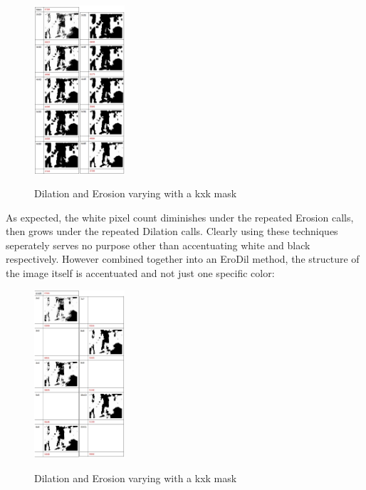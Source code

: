 \documentclass[11pt]{article} %
\begin{document}
\begin{figure}
	\vspace{-20pt}
	\begin{center}
		\includegraphics[width=0.3\textwidth]{../images/ImageOps/test2A}
		\label{img:erode3}
	\end{center}
	\vspace{-20pt}
	\caption{Dilation and Erosion varying with a kxk mask}
\end{figure}
As expected, the white pixel count diminishes under the repeated Erosion calls, then grows under the repeated Dilation calls. Clearly using these techniques seperately serves no purpose other than accentuating white and black respectively. However combined together into an EroDil method, the structure of the image itself is accentuated and not just one specific color:
\begin{figure}
	\vspace{-20pt}
	\begin{center}
		\includegraphics[width=0.3\textwidth]{../images/ImageOps/test2B}
		\label{img:erode4}
	\end{center}
	\vspace{-20pt}
	\caption{Dilation and Erosion varying with a kxk mask}
\end{figure}
\end{document}
